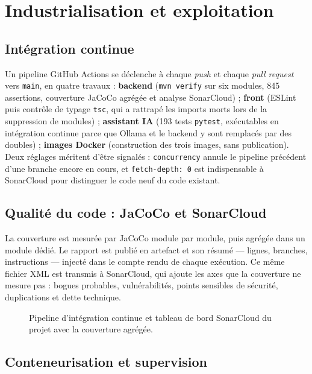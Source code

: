 \section{Industrialisation et exploitation}

\subsection{Intégration continue}

Un pipeline GitHub Actions se déclenche à chaque \emph{push} et chaque
\emph{pull request} vers \texttt{main}, en quatre travaux : \textbf{backend}
(\texttt{mvn verify} sur six modules, 845 assertions, couverture JaCoCo agrégée
et analyse SonarCloud) ; \textbf{front} (ESLint puis contrôle de typage
\texttt{tsc}, qui a rattrapé les imports morts lors de la suppression de
modules) ; \textbf{assistant IA} (193 tests \texttt{pytest}, exécutables en
intégration continue parce que Ollama et le backend y sont remplacés par des
doubles) ; \textbf{images Docker} (construction des trois images, sans
publication). Deux réglages méritent d'être signalés : \texttt{concurrency}
annule le pipeline précédent d'une branche encore en cours, et
\texttt{fetch-depth:~0} est indispensable à SonarCloud pour distinguer le code
neuf du code existant.

\subsection{Qualité du code : JaCoCo et SonarCloud}

La couverture est mesurée par JaCoCo module par module, puis agrégée dans un
module dédié. Le rapport est publié en artefact et son résumé — lignes,
branches, instructions — injecté dans le compte rendu de chaque exécution. Ce
même fichier XML est transmis à SonarCloud, qui ajoute les axes que la
couverture ne mesure pas : bogues probables, vulnérabilités, points sensibles
de sécurité, duplications et dette technique.

\begin{figure}[htbp]
  \centering
  \caption{Pipeline d'intégration continue et tableau de bord SonarCloud du
  projet avec la couverture agrégée.}
  \label{fig:ch4-ci}
\end{figure}

\subsection{Conteneurisation et supervision}

